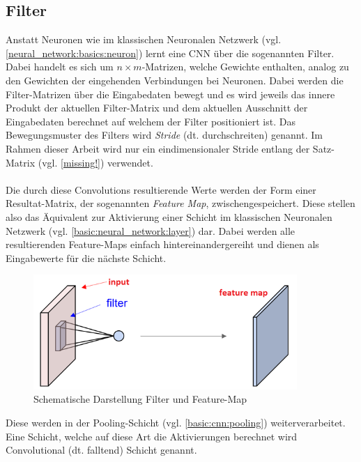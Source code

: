 \subsection{Filter}
\label{basic:cnn:filter}
Anstatt Neuronen wie im klassischen Neuronalen Netzwerk (vgl. \ref{neural_network:basics:neuron}) lernt eine CNN über die sogenannten Filter. Dabei handelt es sich um $n\times m$-Matrizen, welche Gewichte enthalten, analog zu den Gewichten der eingehenden Verbindungen bei Neuronen. Dabei werden die Filter-Matrizen über die Eingabedaten bewegt und es wird jeweils das innere Produkt der aktuellen Filter-Matrix und dem aktuellen Ausschnitt der Eingabedaten berechnet auf welchem der Filter positioniert ist. Das Bewegungsmuster des Filters wird \emph{Stride} (dt. durchschreiten) genannt. Im Rahmen dieser Arbeit wird nur ein eindimensionaler Stride entlang der Satz-Matrix (vgl. \ref{missing!}) verwendet.\\\\
Die durch diese Convolutions resultierende Werte werden der Form einer Resultat-Matrix, der sogenannten \emph{Feature Map}, zwischengespeichert. Diese stellen also das Äquivalent zur Aktivierung einer Schicht im klassischen Neuronalen Netzwerk (vgl. \ref{basic:neural_network:layer}) dar. Dabei werden alle resultierenden Feature-Maps einfach hintereinandergereiht und dienen als Eingabewerte für die nächste Schicht. 

\begin{figure}[h]
	\centering
	\includegraphics[width=10cm]{img/filter_feature_map}
	\caption{Schematische Darstellung Filter und Feature-Map}
\end{figure}

Diese werden in der Pooling-Schicht (vgl. \ref{basic:cnn:pooling}) weiterverarbeitet. Eine Schicht, welche auf diese Art die Aktivierungen berechnet wird Convolutional (dt.  falltend) Schicht genannt.

